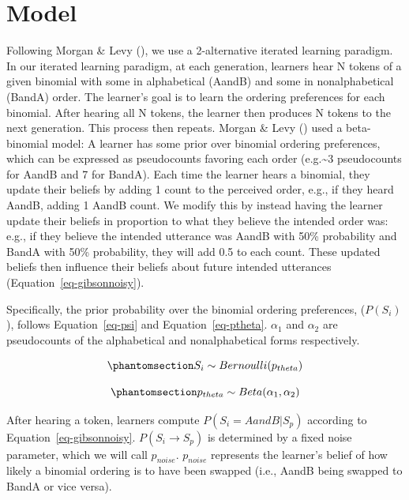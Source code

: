 \documentclass[
  12pt,
  letterpaper,
]{scrreport}
\begin{document}
\section{Model}\label{model}

Following Morgan \& Levy
(),
we use a 2-alternative iterated learning paradigm. In our iterated
learning paradigm, at each generation, learners hear N tokens of a given
binomial with some in alphabetical (AandB) and some in nonalphabetical
(BandA) order. The learner's goal is to learn the ordering preferences
for each binomial. After hearing all N tokens, the learner then produces
N tokens to the next generation. This process then repeats. Morgan \&
Levy
()
used a beta-binomial model: A learner has some prior over binomial
ordering preferences, which can be expressed as pseudocounts favoring
each order (e.g.\textasciitilde3 pseudocounts for AandB and 7 for
BandA). Each time the learner hears a binomial, they update their
beliefs by adding 1 count to the perceived order, e.g., if they heard
AandB, adding 1 AandB count. We modify this by instead having the
learner update their beliefs in proportion to what they believe the
intended order was: e.g., if they believe the intended utterance was
AandB with 50\% probability and BandA with 50\% probability, they will
add 0.5 to each count. These updated beliefs then influence their
beliefs about future intended utterances
(Equation~\ref{eq-gibsonnoisy}).

Specifically, the prior probability over the binomial ordering
preferences, (\(P(S_i)\)), follows Equation~\ref{eq-psi} and
Equation~\ref{eq-ptheta}. \(\alpha_1\) and \(\alpha_2\) are pseudocounts
of the alphabetical and nonalphabetical forms respectively.

\begin{equation}\phantomsection\label{eq-psi}{
S_i \sim Bernoulli(p_{theta})
}\end{equation}

\begin{equation}\phantomsection\label{eq-ptheta}{
p_{theta} \sim Beta(\alpha_1, \alpha_2)
}\end{equation}

After hearing a token, learners compute \(P(S_i = AandB|S_p)\) according
to Equation~\ref{eq-gibsonnoisy}. \(P(S_i \to S_p)\) is determined by a
fixed noise parameter, which we will call \(p_{noise}\). \(p_{noise}\)
represents the learner's belief of how likely a binomial ordering is to
have been swapped (i.e., AandB being swapped to BandA or vice versa).
\end{document}

